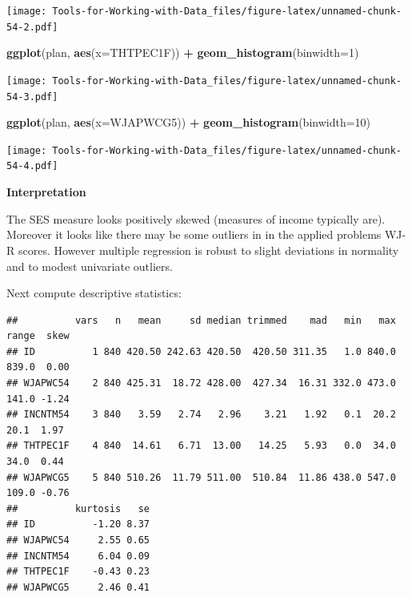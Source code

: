 \documentclass[
]{book}
\newenvironment{Shaded}{\begin{snugshade}}{\end{snugshade}}
\newcommand{\DataTypeTok}[1]{\textcolor[rgb]{0.13,0.29,0.53}{#1}}
\newcommand{\DecValTok}[1]{\textcolor[rgb]{0.00,0.00,0.81}{#1}}
\newcommand{\KeywordTok}[1]{\textcolor[rgb]{0.13,0.29,0.53}{\textbf{#1}}}
\newcommand{\NormalTok}[1]{#1}
\newcommand{\OperatorTok}[1]{\textcolor[rgb]{0.81,0.36,0.00}{\textbf{#1}}}
\newcommand{\StringTok}[1]{\textcolor[rgb]{0.31,0.60,0.02}{#1}}
\begin{document}
\texttt{[image: Tools-for-Working-with-Data\_files/figure-latex/unnamed-chunk-54-2.pdf]}

\begin{Shaded}
\begin{Highlighting}[]
\KeywordTok{ggplot}\NormalTok{(plan, }\KeywordTok{aes}\NormalTok{(}\DataTypeTok{x=}\NormalTok{THTPEC1F)) }\OperatorTok{+}
\StringTok{  }\KeywordTok{geom_histogram}\NormalTok{(}\DataTypeTok{binwidth=}\DecValTok{1}\NormalTok{)}
\end{Highlighting}
\end{Shaded}

\texttt{[image: Tools-for-Working-with-Data\_files/figure-latex/unnamed-chunk-54-3.pdf]}

\begin{Shaded}
\begin{Highlighting}[]
\KeywordTok{ggplot}\NormalTok{(plan, }\KeywordTok{aes}\NormalTok{(}\DataTypeTok{x=}\NormalTok{WJAPWCG5)) }\OperatorTok{+}
\StringTok{  }\KeywordTok{geom_histogram}\NormalTok{(}\DataTypeTok{binwidth=}\DecValTok{10}\NormalTok{)}
\end{Highlighting}
\end{Shaded}

\texttt{[image: Tools-for-Working-with-Data\_files/figure-latex/unnamed-chunk-54-4.pdf]}

\textbf{Interpretation}

The SES measure looks positively skewed (measures of income typically are). Moreover it looks like there may be some outliers in in the applied problems WJ-R scores. However multiple regression is robust to slight deviations in normality and to modest univariate outliers.

Next compute descriptive statistics:

\begin{Shaded}
\end{Shaded}

\begin{verbatim}
##          vars   n   mean     sd median trimmed    mad   min   max range  skew
## ID          1 840 420.50 242.63 420.50  420.50 311.35   1.0 840.0 839.0  0.00
## WJAPWC54    2 840 425.31  18.72 428.00  427.34  16.31 332.0 473.0 141.0 -1.24
## INCNTM54    3 840   3.59   2.74   2.96    3.21   1.92   0.1  20.2  20.1  1.97
## THTPEC1F    4 840  14.61   6.71  13.00   14.25   5.93   0.0  34.0  34.0  0.44
## WJAPWCG5    5 840 510.26  11.79 511.00  510.84  11.86 438.0 547.0 109.0 -0.76
##          kurtosis   se
## ID          -1.20 8.37
## WJAPWC54     2.55 0.65
## INCNTM54     6.04 0.09
## THTPEC1F    -0.43 0.23
## WJAPWCG5     2.46 0.41
\end{verbatim}
\end{document}
